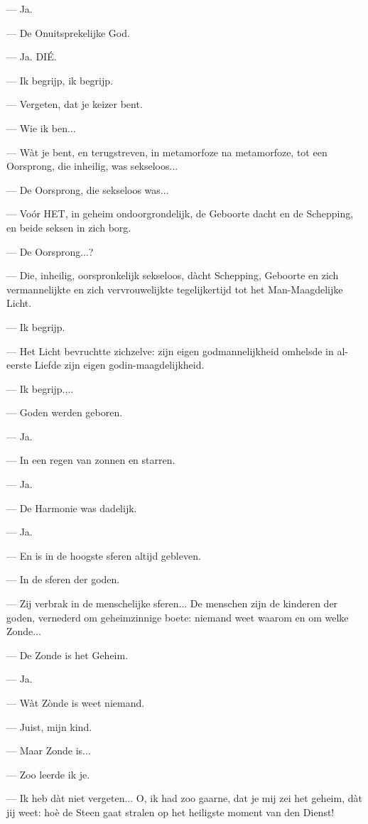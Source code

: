 \documentclass[a4paper, 12pt, oneside, dutch]{article}
\begin{document}
--- Ja.

--- De Onuitsprekelijke God.

--- Ja. DIÉ.

--- Ik begrijp, ik begrijp.

--- Vergeten, dat je keizer bent.

--- Wie ik ben...

--- Wàt je bent, en terugstreven, in metamorfoze na metamorfoze, tot een Oorsprong, die inheilig, was sekseloos...

--- De Oorsprong, die sekseloos was...

--- Voór HET, in geheim ondoorgrondelijk, de Geboorte dacht en de Schepping, en beide seksen in zich borg.

--- De Oorsprong...?

--- Die, inheilig, oorspronkelijk sekseloos, dàcht Schepping, Geboorte en zich vermannelijkte en zich vervrouwelijkte tegelijkertijd tot het Man-Maagdelijke Licht.

--- Ik begrijp.

--- Het Licht bevruchtte zichzelve: zijn eigen godmannelijkheid omhelsde in al-eerste Liefde zijn eigen godin-maagdelijkheid.

--- Ik begrijp.,..

--- Goden werden geboren.

--- Ja.

--- In een regen van zonnen en starren.

--- Ja.

--- De Harmonie was dadelijk.

--- Ja.

--- En is in de hoogste sferen altijd gebleven.

--- In de sferen der goden.

--- Zij verbrak in de menschelijke sferen... De menschen zijn de kinderen der goden, vernederd om geheimzinnige boete: niemand weet waarom en om welke Zonde...

--- De Zonde is het Geheim.

--- Ja.

--- Wàt Zònde is weet niemand.

--- Juist, mijn kind.

--- Maar Zonde is...

--- Zoo leerde ik je.

--- Ik heb dàt niet vergeten... O, ik had zoo gaarne, dat je mij zei het geheim, dàt jij weet: hoè de Steen gaat stralen op het heiligste moment van den Dienst!
\end{document}
